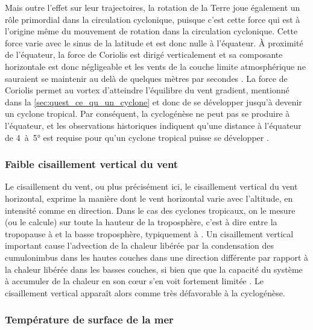 \documentclass[../main.tex]{subfiles}
\begin{document}
Mais outre l'effet sur leur trajectoires, la rotation de la Terre joue également un rôle primordial dans la circulation cyclonique, puisque c'est cette force qui
est à l'origine même du mouvement de rotation dans la circulation cyclonique. Cette force varie avec le sinus de la latitude et est donc nulle à l'équateur. À
proximité de l'équateur, la force de Coriolis est dirigé verticalement  et sa composante horizontale est donc négligeable et les vents de la couche limite atmosphérique ne sauraient se maintenir au delà de quelques
mètres par secondes \parencite{gray_tropical_1975}. La force de Coriolis permet au vortex d'atteindre l'équilibre du vent gradient, mentionné dans la
\cref{sec:quest_ce_qu_un_cyclone} et donc de se développer jusqu'à devenir un cyclone tropical. Par conséquent, la cyclogénèse ne peut pas se produire à
l'équateur, et les observations historiques indiquent qu'une distance à l'équateur de \num{4}~à~\ang{5} est requise pour qu'un cyclone tropical puisse se
développer \parencite{gray_global_1968}.

\subsubsection*{Faible cisaillement vertical du vent}

Le cisaillement du vent, ou plus précisément ici, le cisaillement vertical du vent horizontal, exprime la manière dont le vent horizontal varie avec l'altitude,
en intensité comme en direction. Dans le cas des cyclones tropicaux, on le mesure (ou le calcule) sur toute la hauteur de la troposphère, c'est à dire entre la
tropopause à  et la basse troposphère, typiquement à . Un cisaillement vertical important cause l'advection de la chaleur libérée par la condensation des cumulonimbus dans les hautes couches dans une direction différente par rapport à la chaleur libérée dans les basses couches, si bien que que la capacité du système à accumuler de la chaleur en son cœur s'en voit fortement limitée \parencite{gray_global_1968}.  Le cisaillement vertical apparaît alors comme très défavorable à la cyclogénèse.

\subsubsection*{Température de surface de la mer}
\end{document}
